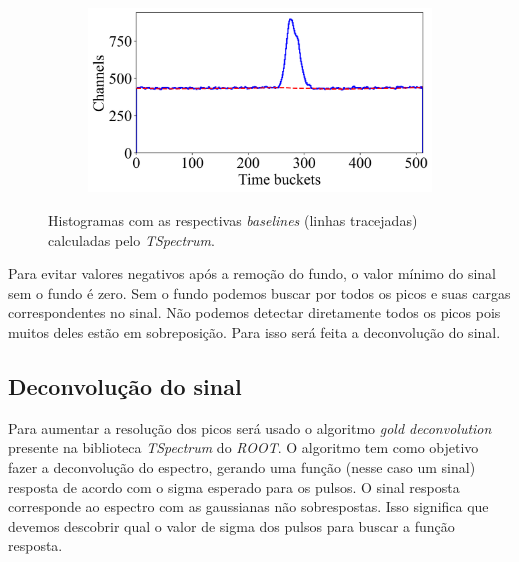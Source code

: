 \documentclass[a4paper,12pt,oneside]{book}
\begin{document}
\begin{figure}[H]
\begin{subfigure}[b]{0.48\textwidth}
        \caption{}
        \label{subfig:ex_sinal_bkg_3}
    \end{subfigure}%
    \hfill
    \begin{subfigure}[b]{0.48\textwidth}
        \centering
        \includegraphics[scale=0.395]{figs/ex_sinal_bkg_4.png}
        \caption{}
        \label{subfig:ex_sinal_bkg_4}
    \end{subfigure}
\caption{Histogramas com as respectivas \textit{baselines} (linhas tracejadas) calculadas pelo \textit{TSpectrum}.}
\label{fig:ex_sinal_bkg}
\end{figure}

\par Para evitar valores negativos após a remoção do fundo, o valor mínimo do sinal sem o fundo é zero. Sem o fundo podemos buscar por todos os picos e suas cargas correspondentes no sinal. Não podemos detectar diretamente todos os picos pois muitos deles estão em sobreposição. Para isso será feita a deconvolução do sinal.



\subsection{Deconvolução do sinal}

Para aumentar a resolução dos picos será usado o algoritmo \textit{gold deconvolution} presente na biblioteca \textit{TSpectrum} do \textit{ROOT}\cite{paper_gold_deconv}. O algoritmo tem como objetivo fazer a deconvolução do espectro, gerando uma função (nesse caso um sinal) resposta de acordo com o sigma esperado para os pulsos. O sinal resposta corresponde ao espectro com as gaussianas não sobrespostas. Isso significa que devemos descobrir qual o valor de sigma dos pulsos para buscar a função resposta.
\end{document}
